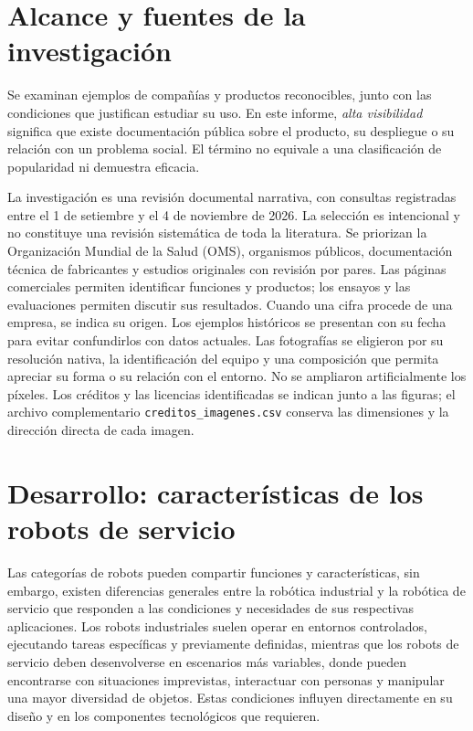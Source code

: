 \documentclass[11pt,a4paper]{article}
\begin{document}
\section{Alcance y fuentes de la investigación}
Se examinan ejemplos de compañías y productos reconocibles, junto con las condiciones que justifican estudiar su uso. En este informe, \emph{alta visibilidad} significa que existe documentación pública sobre el producto, su despliegue o su relación con un problema social. El término no equivale a una clasificación de popularidad ni demuestra eficacia.

La investigación es una revisión documental narrativa, con consultas registradas entre el 1 de setiembre y el 4 de noviembre de 2026. La selección es intencional y no constituye una revisión sistemática de toda la literatura. Se priorizan la Organización Mundial de la Salud (OMS), organismos públicos, documentación técnica de fabricantes y estudios originales con revisión por pares. Las páginas comerciales permiten identificar funciones y productos; los ensayos y las evaluaciones permiten discutir sus resultados. Cuando una cifra procede de una empresa, se indica su origen. Los ejemplos históricos se presentan con su fecha para evitar confundirlos con datos actuales. Las fotografías se eligieron por su resolución nativa, la identificación del equipo y una composición que permita apreciar su forma o su relación con el entorno. No se ampliaron artificialmente los píxeles. Los créditos y las licencias identificadas se indican junto a las figuras; el archivo complementario \texttt{creditos\_imagenes.csv} conserva las dimensiones y la dirección directa de cada imagen.

\section{Desarrollo: características de los robots de servicio}
Las categorías de robots pueden compartir funciones y características, sin embargo, existen diferencias generales entre la robótica industrial y la robótica de servicio que responden a las condiciones y necesidades de sus respectivas aplicaciones. Los robots industriales suelen operar en entornos controlados, ejecutando tareas específicas y previamente definidas, mientras que los robots de servicio deben desenvolverse en escenarios más variables, donde pueden encontrarse con situaciones imprevistas, interactuar con personas y manipular una mayor diversidad de objetos. Estas condiciones influyen directamente en su diseño y en los componentes tecnológicos que requieren.
\end{document}
